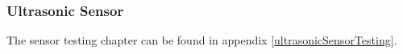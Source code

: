 \subsubsection{Ultrasonic Sensor}
The sensor testing chapter can be found in appendix \ref{ultrasonicSensorTesting}.
